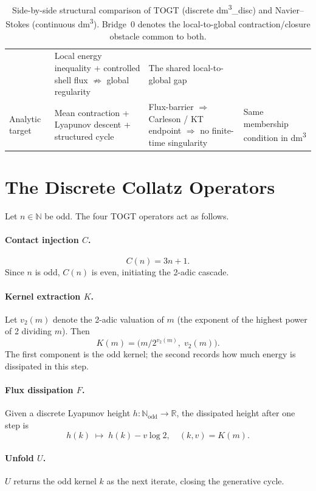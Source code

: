 \documentclass[11pt,a4paper]{article}
\theoremstyle{definition}
\theoremstyle{plain}
\begin{document}
\begin{table}[ht]
\begin{tabular}{@{}p{3.2cm}p{4.1cm}p{4.1cm}p{4.1cm}@{}}
  & Local energy inequality + controlled shell flux $\not\Rightarrow$ global regularity
  & The shared local-to-global gap \\[4pt]
Analytic target
  & Mean contraction + Lyapunov descent + structured cycle
  & Flux-barrier $\Rightarrow$ Carleson / KT endpoint $\Rightarrow$ no finite-time singularity
  & Same membership condition in dm\textsuperscript{3} \\
\bottomrule
\end{tabular}
\caption{Side-by-side structural comparison of TOGT (discrete dm\textsuperscript{3}\_disc) and
  Navier--Stokes (continuous dm\textsuperscript{3}). Bridge~0 denotes the local-to-global
  contraction/closure obstacle common to both.}
\label{tab:togt-vs-ns}
\end{table}

\section{The Discrete Collatz Operators}
\label{sec:operators}

Let $n \in \mathbb{N}$ be odd. The four TOGT operators act as follows.

\paragraph{Contact injection $C$.}
\[
  C(n) = 3n + 1.
\]
Since $n$ is odd, $C(n)$ is even, initiating the 2-adic cascade.

\paragraph{Kernel extraction $K$.}
Let $v_2(m)$ denote the 2-adic valuation of $m$ (the exponent of the highest power of 2
dividing $m$). Then
\[
  K(m) = \bigl(m/2^{v_2(m)},\; v_2(m)\bigr).
\]
The first component is the odd kernel; the second records how much energy is dissipated in
this step.

\paragraph{Flux dissipation $F$.}
Given a discrete Lyapunov height $h : \mathbb{N}_{\mathrm{odd}} \to \mathbb{R}$, the dissipated
height after one step is
\[
  h(k) \;\longmapsto\; h(k) - v \log 2,\quad (k, v) = K(m).
\]

\paragraph{Unfold $U$.}
$U$ returns the odd kernel $k$ as the next iterate, closing the generative cycle.
\end{document}
